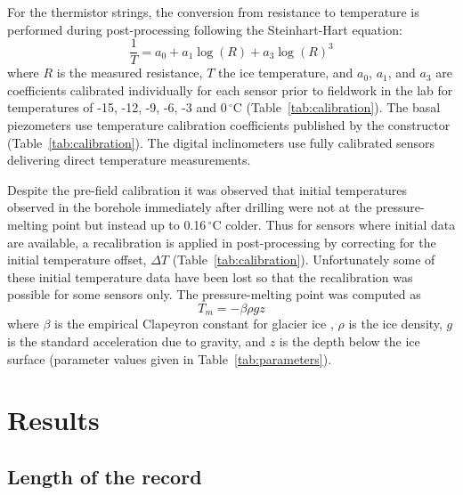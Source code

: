 \documentclass[utf8]{article}
\begin{document}
    For the thermistor strings, the conversion from resistance to temperature
    is performed during post-processing following the Steinhart-Hart equation:
    \begin{equation}
      \frac{1}{T} = a_0 + a_1 \log(R) + a_3 \log(R)^3
    \end{equation}
    where $R$ is the measured resistance, $T$ the ice temperature, and $a_0$,
    $a_1$, and $a_3$ are coefficients calibrated individually for each sensor
    prior to fieldwork in the lab for temperatures of -15, -12, -9, -6, -3 and
    0\,$^\circ$C (Table~\ref{tab:calibration}). The basal piezometers use
    temperature calibration coefficients published by the constructor
    (Table~\ref{tab:calibration}). The digital inclinometers use fully
    calibrated sensors delivering direct temperature measurements.

    Despite the pre-field calibration it was observed that initial temperatures
    observed in the borehole immediately after drilling were not at the
    pressure-melting point but instead up to 0.16\,$^\circ$C colder.  Thus for
    sensors where initial data are available, a recalibration is applied in
    post-processing by correcting for the initial temperature offset, $\Delta
    T$ (Table~\ref{tab:calibration}). Unfortunately some of these initial
    temperature data have been lost so that the recalibration was possible for
    some sensors only. The pressure-melting point was computed as
    \begin{equation}
      T_m = -\beta \rho g z
    \end{equation}
    where $\beta$ is the empirical Clapeyron constant for glacier ice
    \citep{Luthi.etal.2002}, $\rho$ is the ice density, $g$ is the standard
    acceleration due to gravity, and $z$ is the depth below the ice surface
    (parameter values given in Table~\ref{tab:parameters}).


\section{Results}

\subsection{Length of the record}
\end{document}

